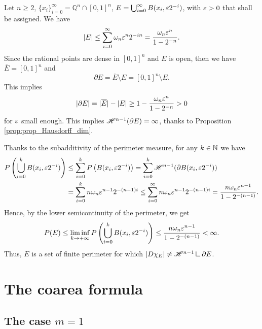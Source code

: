 \begin{example} \label{ex:Giusti_cheese} 
Let $n \ge 2$, $\{ x_{i} \}_{i = 0}^{\infty} = \mathbb{Q}^{n} \cap [0, 1]^{n}$, $E = \bigcup_{i = 0}^{\infty} B(x_{i}, \varepsilon 2^{-i})$, with $\varepsilon > 0$ that shall be assigned. We have
\[ |E| \le \sum_{i = 0}^{\infty} \omega_{n} \varepsilon^{n} 2^{-i n} = \frac{\omega_{n} \varepsilon^{n}}{1 - 2^{- n}}. \]
Since the rational points are dense in $[0, 1]^{n}$ and $E$ is open, then we have $\overline{E} = [0, 1]^{n}$ and $$\partial E = \overline{E} \setminus E = [0, 1]^{n} \setminus E.$$ This implies
\[ |\partial E| = |\overline{E}| - |E| \ge 1 - \frac{\omega_{n} \varepsilon^{n}}{1 - 2^{- n}} > 0 \]
for $\varepsilon$ small enough. This implies $\mathscr{H}^{n - 1}(\partial E) = \infty$, thanks to Proposition \ref{prop:prop_Hausdorff_dim}. 

Thanks to the subadditivity of the perimeter measure, for any $k \in \mathbb{N}$ we have
\begin{align*} P\left ( \bigcup_{i = 0}^{k} B(x_{i}, \varepsilon 2^{-i}) \right ) & \le \sum_{i = 0}^{k} P \left ( B(x_{i}, \varepsilon 2^{-i}) \right ) =  \sum_{i = 0}^{k} \mathscr{H}^{n - 1}(\partial B(x_{i}, \varepsilon 2^{- i})) \\
& = \sum_{i = 0}^{k} n \omega_{n} \varepsilon^{n - 1} 2^{- (n - 1) i} \le \sum_{i = 0}^{\infty} n \omega_{n} \varepsilon^{n - 1} 2^{- (n - 1) i} = \frac{n \omega_{n} \varepsilon^{n - 1}}{1 - 2^{- (n - 1)}}.
\end{align*}
Hence, by the lower semicontinuity of the perimeter, we get
\begin{equation*}
P(E) \le \liminf_{k \to + \infty} P\left ( \bigcup_{i = 0}^{k} B(x_{i}, \varepsilon 2^{-i}) \right ) \le \frac{n \omega_{n} \varepsilon^{n - 1}}{1 - 2^{- (n - 1)}} < \infty.
\end{equation*}
Thus, $E$ is a set of finite perimeter for which $|D \chi_{E}| \neq \Haus{n - 1} \res \partial E$. 
\end{example}

















\section{The coarea formula}

\subsection{The case $m = 1$}

